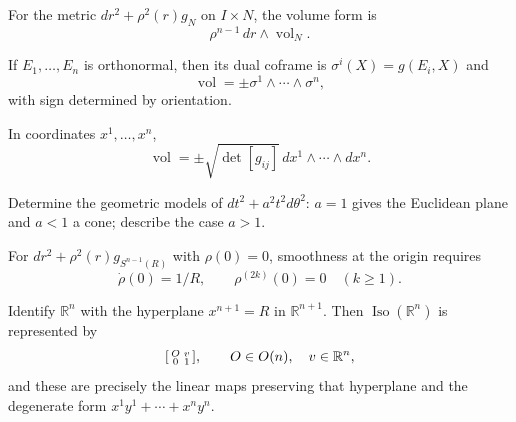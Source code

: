 \begin{remark}
  \label{rem:pet-ch1-ex-4}
  \leanok
  For the metric $dr^2+\rho^2(r)g_N$ on $I\times N$, the volume form is
  \[
    \rho^{n-1}\,dr\wedge\operatorname{vol}_N.
  \]
\end{remark}

\begin{remark}
  \label{rem:pet-ch1-ex-5}
  \leanok
  If $E_1,\ldots,E_n$ is orthonormal, then its dual coframe is
  $\sigma^i(X)=g(E_i,X)$ and
  \[
    \operatorname{vol}=\pm\sigma^1\wedge\cdots\wedge\sigma^n,
  \]
  with sign determined by orientation.
\end{remark}

\begin{remark}
  \label{rem:pet-ch1-ex-6}
  \leanok
  In coordinates $x^1,\ldots,x^n$,
  \[
    \operatorname{vol}
      =\pm\sqrt{\det[g_{ij}]}\,dx^1\wedge\cdots\wedge dx^n.
  \]
\end{remark}

\begin{remark}
  \label{rem:pet-ch1-ex-7}
  \leanok
  Determine the geometric models of
  $dt^2+a^2t^2d\theta^2$: $a=1$ gives the Euclidean plane and $a<1$ a cone;
  describe the case $a>1$.
\end{remark}

\begin{remark}
  \label{rem:pet-ch1-ex-8}
  \leanok
  For
  $dr^2+\rho^2(r)g_{S^{n-1}(R)}$ with $\rho(0)=0$, smoothness at the origin
  requires
  \[
    \dot\rho(0)=1/R,
    \qquad \rho^{(2k)}(0)=0\quad(k\ge1).
  \]
\end{remark}

\begin{remark}
  \label{rem:pet-ch1-ex-9}
  \leanok
  Identify $\mathbb{R}^n$ with the hyperplane $x^{n+1}=R$ in
  $\mathbb{R}^{n+1}$. Then $\operatorname{Iso}(\mathbb{R}^n)$ is represented by
  \[
    \begin{bsmallmatrix}O&v\\0&1\end{bsmallmatrix},
    \qquad O\in O(n),\quad v\in\mathbb{R}^n,
  \]
  and these are precisely the linear maps preserving that hyperplane and the
  degenerate form $x^1y^1+\cdots+x^ny^n$.
\end{remark}

